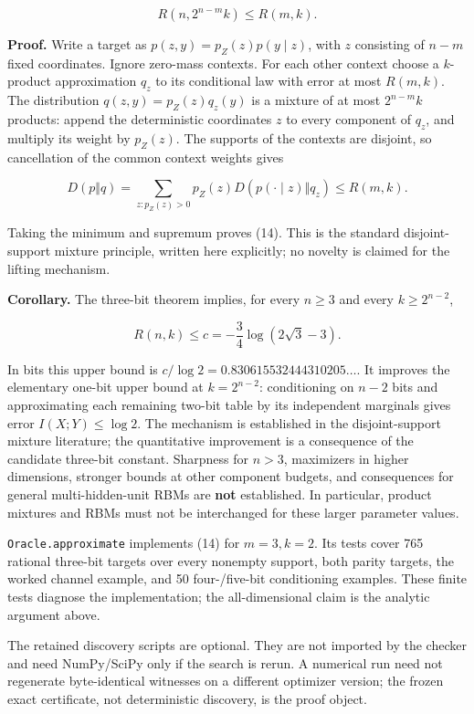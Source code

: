 \[
R(n,2^{n-m}k)\le R(m,k).
\tag{14}
\]

\textbf{Proof.} Write a target as \(p(z,y)=p_Z(z)p(y\mid z)\), with
\(z\) consisting of \(n-m\) fixed coordinates. Ignore zero-mass
contexts. For each other context choose a \(k\)-product approximation
\(q_z\) to its conditional law with error at most \(R(m,k)\). The
distribution \(q(z,y)=p_Z(z)q_z(y)\) is a mixture of at most
\(2^{n-m}k\) products: append the deterministic coordinates \(z\) to
every component of \(q_z\), and multiply its weight by \(p_Z(z)\). The
supports of the contexts are disjoint, so cancellation of the common
context weights gives

\[
D(p\Vert q)=\sum_{z:p_Z(z)>0}p_Z(z)D(p(\cdot\mid z)\Vert q_z)
\le R(m,k).
\]

Taking the minimum and supremum proves (14). This is the standard
disjoint-support mixture principle, written here explicitly; no novelty
is claimed for the lifting mechanism.

\textbf{Corollary.} The three-bit theorem implies, for every \(n\ge3\)
and every \(k\ge2^{n-2}\),

\[
R(n,k)\le c=-\frac34\log(2\sqrt3-3).
\tag{15}
\]

In bits this upper bound is \(c/\log2=0.830615532444310205\ldots\). It
improves the elementary one-bit upper bound at \(k=2^{n-2}\):
conditioning on \(n-2\) bits and approximating each remaining two-bit
table by its independent marginals gives error \(I(X;Y)\le\log2\). The
mechanism is established in the disjoint-support mixture literature; the
quantitative improvement is a consequence of the candidate three-bit
constant. Sharpness for \(n>3\), maximizers in higher dimensions,
stronger bounds at other component budgets, and consequences for general
multi-hidden-unit RBMs are \textbf{not} established. In particular,
product mixtures and RBMs must not be interchanged for these larger
parameter values.

\texttt{Oracle.approximate} implements (14) for \(m=3,k=2\). Its tests
cover 765 rational three-bit targets over every nonempty support, both
parity targets, the worked channel example, and 50 four-/five-bit
conditioning examples. These finite tests diagnose the implementation;
the all-dimensional claim is the analytic argument above.

The retained discovery scripts are optional. They are not imported by
the checker and need NumPy/SciPy only if the search is rerun. A
numerical run need not regenerate byte-identical witnesses on a
different optimizer version; the frozen exact certificate, not
deterministic discovery, is the proof object.

